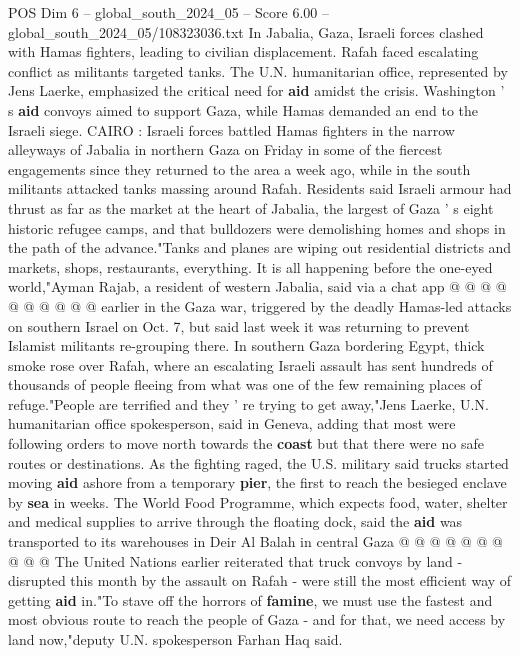 \begin{textsample}{POS Dim 6 – global\_south\_2024\_05 – Score 6.00 – global\_south\_2024\_05/108323036.txt}  \label{ex:f6_pos_154}
In Jabalia, Gaza, Israeli forces clashed with Hamas fighters, leading to civilian displacement.
Rafah faced escalating conflict as militants targeted tanks.
The U.N. humanitarian office, represented by Jens Laerke, emphasized the critical need for \textbf{aid} amidst the crisis.
Washington ' s \textbf{aid} convoys aimed to support Gaza, while Hamas demanded an end to the Israeli siege.
CAIRO : Israeli forces battled Hamas fighters in the narrow alleyways of Jabalia in northern Gaza on Friday in some of the fiercest engagements since they returned to the area a week ago, while in the south militants attacked tanks massing around Rafah.
Residents said Israeli armour had thrust as far as the market at the heart of Jabalia, the largest of Gaza ' s eight historic refugee camps, and that bulldozers were demolishing homes and shops in the path of the advance."Tanks and planes are wiping out residential districts and markets, shops, restaurants, everything.
It is all happening before the one-eyed world,"Ayman Rajab, a resident of western Jabalia, said via a chat app @ @ @ @ @ @ @ @ @ @ earlier in the Gaza war, triggered by the deadly Hamas-led attacks on southern Israel on Oct. 7, but said last week it was returning to prevent Islamist militants re-grouping there.
In southern Gaza bordering Egypt, thick smoke rose over Rafah, where an escalating Israeli assault has sent hundreds of thousands of people fleeing from what was one of the few remaining places of refuge."People are terrified and they ' re trying to get away,"Jens Laerke, U.N. humanitarian office spokesperson, said in Geneva, adding that most were following orders to move north towards the \textbf{coast} but that there were no safe routes or destinations.
As the fighting raged, the U.S. military said trucks started moving \textbf{aid} ashore from a temporary \textbf{pier}, the first to reach the besieged enclave by \textbf{sea} in weeks.
The World Food Programme, which expects food, water, shelter and medical supplies to arrive through the floating dock, said the \textbf{aid} was transported to its warehouses in Deir Al Balah in central Gaza @ @ @ @ @ @ @ @ @ @ The United Nations earlier reiterated that truck convoys by land - disrupted this month by the assault on Rafah - were still the most efficient way of getting \textbf{aid} in."To stave off the horrors of \textbf{famine}, we must use the fastest and most obvious route to reach the people of Gaza - and for that, we need access by land now,"deputy U.N. spokesperson Farhan Haq said.

\end{textsample}
